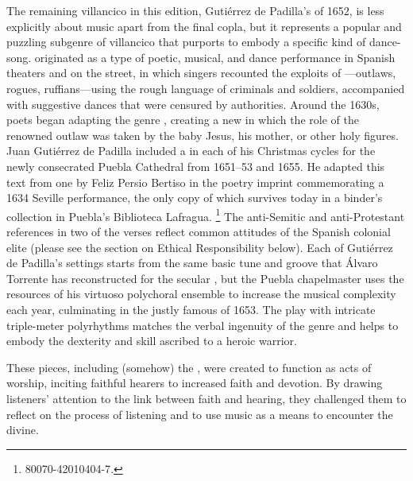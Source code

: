 The remaining villancico in this edition, Gutiérrez de Padilla's 
of 1652, is less explicitly about music apart from the final copla, but it
represents a popular and puzzling subgenre of villancico that purports to
embody a specific kind of dance-song.%
   \Autocite[Recording,][]{Padilla:1652ChristmasCD} 
 originated as a type of poetic, musical, and dance performance
in Spanish theaters and on the street, in which singers recounted the exploits
of ---outlaws, rogues, ruffians---using the rough language of
criminals and soldiers, accompanied with suggestive dances that were censured
by authorities.%
    \Autocite{Torrente:Jacara}
Around the 1630s, poets began adapting the genre , creating
a new  in which the role of the renowned outlaw
was taken by the baby Jesus, his mother, or other holy figures.
Juan Gutiérrez de Padilla included a  in each of his Christmas
cycles for the newly consecrated Puebla Cathedral from 1651--53 and 1655.
He adapted this text from one by Feliz Persio Bertiso in the poetry imprint
commemorating a 1634 Seville performance, the only copy of which survives
today in a binder's collection in Puebla's Biblioteca Lafragua.%
    \footnote{\signature{MEX-Plf}{80070-42010404-7}.}
The anti-Semitic and anti-Protestant references in two of the verses reflect
common attitudes of the Spanish colonial elite (please see the section on
Ethical Responsibility below).
Each of Gutiérrez de Padilla's  settings starts from the same
basic tune and groove that Álvaro Torrente has reconstructed for the secular
, but the Puebla chapelmaster uses the resources of his virtuoso
polychoral ensemble to increase the musical complexity each year, culminating
in the justly famous  of 1653.
The play with intricate triple-meter polyrhythms matches the verbal ingenuity
of the genre and helps to embody the dexterity and skill ascribed to a 
heroic warrior.

These pieces, including (somehow) the , were created to function
as acts of worship, inciting faithful hearers to increased faith and devotion.
By drawing listeners' attention to the link between faith and hearing, they
challenged them to reflect on the process of listening and to use music as a
means to encounter the divine.

\endinput

